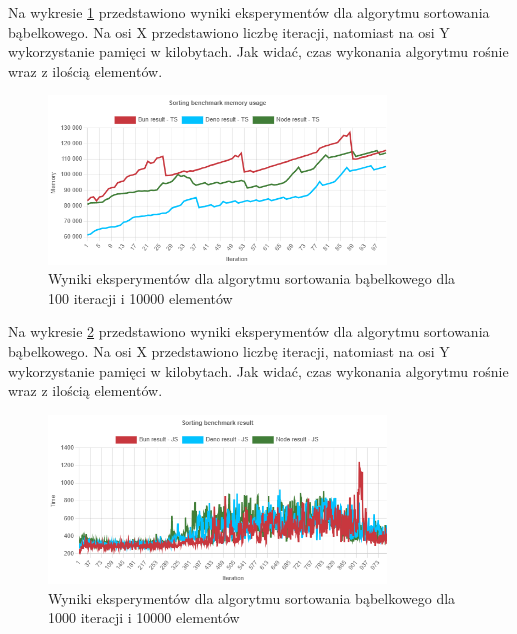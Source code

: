 Na wykresie \ref{fig:bubble_sorting_e5_memory_ts} przedstawiono wyniki eksperymentów dla algorytmu sortowania bąbelkowego. Na osi X przedstawiono liczbę iteracji, natomiast na osi Y wykorzystanie pamięci w kilobytach. Jak widać, czas wykonania algorytmu rośnie wraz z ilością elementów.
\begin{figure}[H]
  \centering
  \includegraphics[width=0.8\textwidth]{Figures/sorting/bubble/e5_memory_ts.png}
  \caption{Wyniki eksperymentów dla algorytmu sortowania bąbelkowego dla 100 iteracji i 10000 elementów}
  \label{fig:bubble_sorting_e5_memory_ts}
\end{figure}

Na wykresie \ref{fig:bubble_sorting_e6} przedstawiono wyniki eksperymentów dla algorytmu sortowania bąbelkowego. Na osi X przedstawiono liczbę iteracji, natomiast na osi Y wykorzystanie pamięci w kilobytach. Jak widać, czas wykonania algorytmu rośnie wraz z ilością elementów.
\begin{figure}[H]
  \centering
  \includegraphics[width=0.8\textwidth]{Figures/sorting/bubble/e6_js.png}
  \caption{Wyniki eksperymentów dla algorytmu sortowania bąbelkowego dla 1000 iteracji i 10000 elementów}
  \label{fig:bubble_sorting_e6}
\end{figure}

